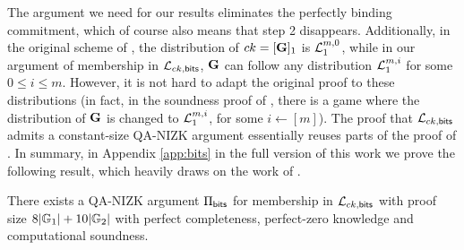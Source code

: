 The argument we need for our results eliminates the perfectly binding commitment, which of course also means that step 2 disappears. Additionally, in the original scheme of \cite{AC:GonHevRaf15}, the distribution of $ck=[\mathbf{{G}}]_1$ is $\mathcal{L}_1^{m,0}$, while in our argument of membership in 
$\mathcal{L}_{ck,\mathsf{bits}}$, $\mathbf{{G}}$ can follow any distribution $\mathcal{L}_1^{m,i}$ for some $0 \leq i \leq m$. 
However, it is not hard to adapt the original proof to these distributions (in fact, in the soundness proof of 
\cite{AC:GonHevRaf15}, there is a game where the distribution of $\mathbf{{G}}$ is changed to $\mathcal{L}_1^{m,i}$, for some $i \gets [m]$). The proof that $\mathcal{L}_{ck,\mathsf{bits}}$ admits a constant-size QA-NIZK argument essentially reuses parts of the proof of \cite{AC:GonHevRaf15}.  In summary, \iffull in Appendix \ref{app:bits} \else in the full version of this work \fi we prove the following result, which heavily draws on the work of \cite{AC:GonHevRaf15}. 

\begin{theorem} \label{theo:bits} There exists a QA-NIZK argument $\Pi_{\mathsf{bits}}$ for membership in $\mathcal{L}_{ck,\mathsf{bits}}$ with proof size  
$8|\mathbb{G}_1|+10|\mathbb{G}_2|$ with perfect completeness, perfect-zero knowledge and computational soundness. 
\end{theorem}


